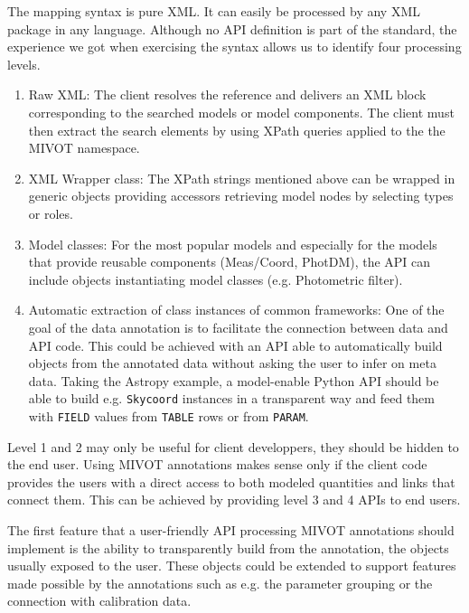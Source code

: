 The mapping syntax is pure XML. It can easily be processed by any XML package in any language.
Although no API definition is part of the standard, the experience we got when exercising the syntax allows us to identify 
four processing levels.

\begin{enumerate} 
  \item Raw XML: The client resolves the reference and delivers an XML block corresponding to the searched models or model components. 
        The client must then extract the search elements by using XPath queries applied to the the MIVOT namespace.
  \item XML Wrapper class: The XPath strings mentioned above can be wrapped in generic objects providing 
        accessors retrieving model nodes by selecting types or roles. 
  \item Model classes: For the most popular models and especially for the models that provide reusable 
        components (Meas/Coord, PhotDM), the API can include objects instantiating model classes (e.g. Photometric filter).
  \item Automatic extraction of class instances of common frameworks: One of the goal of the data annotation is to 
        facilitate the connection between data and API code. This could be achieved with an API able to automatically 
        build objects from the annotated data without asking the user to infer on meta data. Taking the Astropy example, 
        a model-enable Python API should be able to build e.g. \texttt{Skycoord} instances in a transparent way and 
        feed them with \texttt{FIELD} values from \texttt{TABLE} rows or from \texttt{PARAM}.
 \end{enumerate}

Level 1 and 2 may only be useful for client developpers, they should be hidden to the end user. 
Using MIVOT annotations makes sense only if the client code provides 
the users with a direct access to both modeled quantities and links that connect them. 
This can be achieved by providing level 3 and 4 APIs to end users.

The first feature that a user-friendly API processing MIVOT annotations should implement is the ability 
to transparently build from the annotation, the objects usually exposed to the user. 
These objects could be extended to support features made 
possible by the annotations such as e.g. the parameter grouping or the connection with calibration data.
